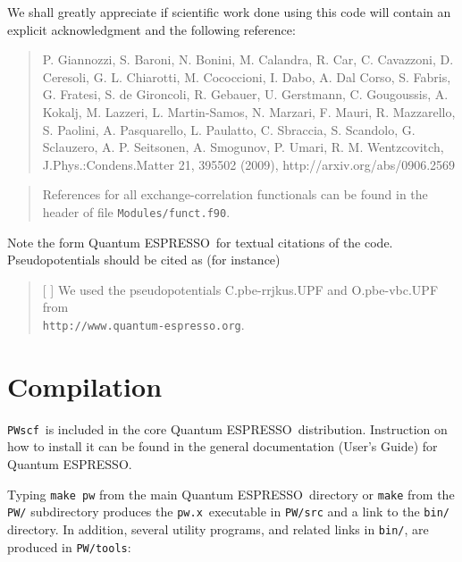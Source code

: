 \documentclass[12pt,a4paper]{article}
\def\PWscf{\texttt{PWscf}}
\def\qe{{\sc Quantum ESPRESSO}}
\def\pwx{\texttt{pw.x}}
\begin{document}
We shall greatly appreciate if scientific work done using this code will 
contain an explicit acknowledgment and the following reference:
\begin{quote}
P. Giannozzi, S. Baroni, N. Bonini, M. Calandra, R. Car, C. Cavazzoni,
D. Ceresoli, G. L. Chiarotti, M. Cococcioni, I. Dabo, A. Dal Corso,
S. Fabris, G. Fratesi, S. de Gironcoli, R. Gebauer, U. Gerstmann,
C. Gougoussis, A. Kokalj, M. Lazzeri, L. Martin-Samos, N. Marzari,
F. Mauri, R. Mazzarello, S. Paolini, A. Pasquarello, L. Paulatto,
C. Sbraccia, S. Scandolo, G. Sclauzero, A. P. Seitsonen, A. Smogunov,
P. Umari, R. M. Wentzcovitch, J.Phys.:Condens.Matter 21, 395502 (2009),
http://arxiv.org/abs/0906.2569
\end{quote}
\begin{quote}
References for all exchange-correlation functionals can be found in the header
of file \texttt{Modules/funct.f90}.
\end{quote}
Note the form \qe\ for textual citations of the code.
Pseudopotentials should be cited as (for instance)
\begin{quote}
[ ] We used the pseudopotentials C.pbe-rrjkus.UPF
and O.pbe-vbc.UPF from\\
\texttt{http://www.quantum-espresso.org}.
\end{quote}

\section{Compilation}

\PWscf\ is included in the core \qe\ distribution.
Instruction on how to install it can be found in the
general documentation (User's Guide) for \qe.

Typing \texttt{make pw} from the main \qe\ directory or
\texttt{make} from the \texttt{PW/} subdirectory produces
the \pwx\ executable in \texttt{PW/src} and a link to the
\texttt{bin/} directory. In addition, several utility
programs, and related links in \texttt{bin/}, are produced 
in \texttt{PW/tools}:
\end{document}

